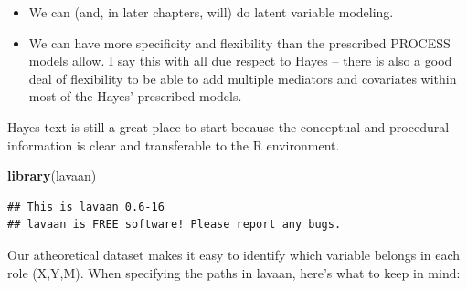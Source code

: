 \documentclass[
  11pt,
]{book}
\newenvironment{Shaded}{\begin{snugshade}}{\end{snugshade}}
\newcommand{\FunctionTok}[1]{\textcolor[rgb]{0.27,0.27,0.27}{\textbf{#1}}}
\newcommand{\NormalTok}[1]{#1}
\providecommand{\tightlist}{%
  \setlength{\itemsep}{0pt}\setlength{\parskip}{0pt}}
\begin{document}
\begin{itemize}
\tightlist
\item
  We can (and, in later chapters, will) do latent variable modeling.
\item
  We can have more specificity and flexibility than the prescribed PROCESS models allow. I say this with all due respect to Hayes -- there is also a good deal of flexibility to be able to add multiple mediators and covariates within most of the Hayes' prescribed models.
\end{itemize}

Hayes text is still a great place to start because the conceptual and procedural information is clear and transferable to the R environment.

\begin{Shaded}
\begin{Highlighting}[]
\FunctionTok{library}\NormalTok{(lavaan)}
\end{Highlighting}
\end{Shaded}

\begin{verbatim}
## This is lavaan 0.6-16
## lavaan is FREE software! Please report any bugs.
\end{verbatim}

Our atheoretical dataset makes it easy to identify which variable belongs in each role (X,Y,M). When specifying the paths in lavaan, here's what to keep in mind:
\end{document}
